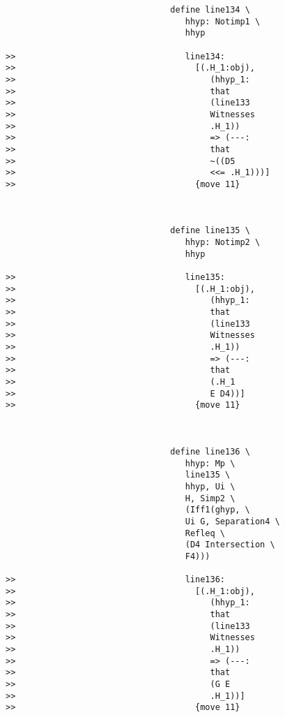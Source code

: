 \documentclass[12pt]{article}
\begin{document}
\begin{verbatim}
                                 define line134 \
                                    hhyp: Notimp1 \
                                    hhyp

>>                                  line134:
>>                                    [(.H_1:obj),
>>                                       (hhyp_1:
>>                                       that
>>                                       (line133
>>                                       Witnesses
>>                                       .H_1))
>>                                       => (---:
>>                                       that
>>                                       ~((D5
>>                                       <<= .H_1)))]
>>                                    {move 11}



                                 define line135 \
                                    hhyp: Notimp2 \
                                    hhyp

>>                                  line135:
>>                                    [(.H_1:obj),
>>                                       (hhyp_1:
>>                                       that
>>                                       (line133
>>                                       Witnesses
>>                                       .H_1))
>>                                       => (---:
>>                                       that
>>                                       (.H_1
>>                                       E D4))]
>>                                    {move 11}



                                 define line136 \
                                    hhyp: Mp \
                                    line135 \
                                    hhyp, Ui \
                                    H, Simp2 \
                                    (Iff1(ghyp, \
                                    Ui G, Separation4 \
                                    Refleq \
                                    (D4 Intersection \
                                    F4)))

>>                                  line136:
>>                                    [(.H_1:obj),
>>                                       (hhyp_1:
>>                                       that
>>                                       (line133
>>                                       Witnesses
>>                                       .H_1))
>>                                       => (---:
>>                                       that
>>                                       (G E
>>                                       .H_1))]
>>                                    {move 11}




\end{verbatim}
\end{document}
